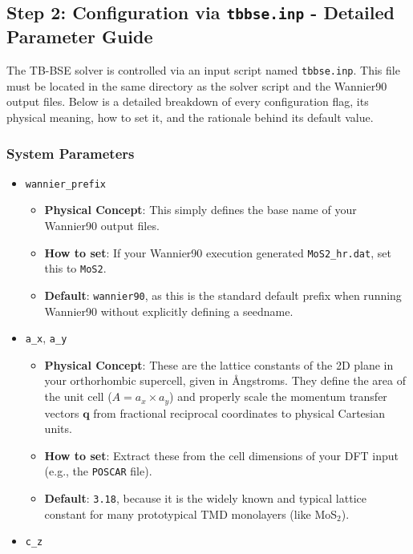 \documentclass[11pt, a4paper]{article}
\begin{document}
\subsection{Step 2: Configuration via \texttt{tbbse.inp} - Detailed Parameter Guide}
The TB-BSE solver is controlled via an input script named \texttt{tbbse.inp}. This file must be located in the same directory as the solver script and the Wannier90 output files. Below is a detailed breakdown of every configuration flag, its physical meaning, how to set it, and the rationale behind its default value.

\subsubsection{System Parameters}
\begin{itemize}
    \item \texttt{wannier\_prefix}
    \begin{itemize}
        \item \textbf{Physical Concept}: This simply defines the base name of your Wannier90 output files.
        \item \textbf{How to set}: If your Wannier90 execution generated \texttt{MoS2\_hr.dat}, set this to \texttt{MoS2}. 
        \item \textbf{Default}: \texttt{wannier90}, as this is the standard default prefix when running Wannier90 without explicitly defining a seedname.
    \end{itemize}
    \item \texttt{a\_x}, \texttt{a\_y}
    \begin{itemize}
        \item \textbf{Physical Concept}: These are the lattice constants of the 2D plane in your orthorhombic supercell, given in \AA ngstroms. They define the area of the unit cell ($A = a_x \times a_y$) and properly scale the momentum transfer vectors $\mathbf{q}$ from fractional reciprocal coordinates to physical Cartesian units.
        \item \textbf{How to set}: Extract these from the cell dimensions of your DFT input (e.g., the \texttt{POSCAR} file).
        \item \textbf{Default}: \texttt{3.18}, because it is the widely known and typical lattice constant for many prototypical TMD monolayers (like MoS$_2$).
    \end{itemize}
    \item \texttt{c\_z}
    \begin{itemize}

\end{itemize}
\end{itemize}
\end{document}

